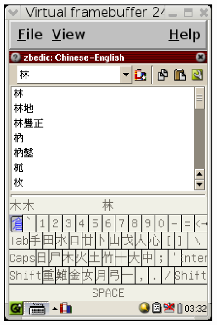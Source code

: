 \documentclass[12pt,a4paper]{article}
\begin{document}
\begin{CJK}{UTF8}{bsmi}
\begin{figure}[htbp]
\centering
\includegraphics[scale=0.9]{eps/changjei.eps}%
\hspace{1in}%

\end{figure}
\end{CJK}
\end{document}
